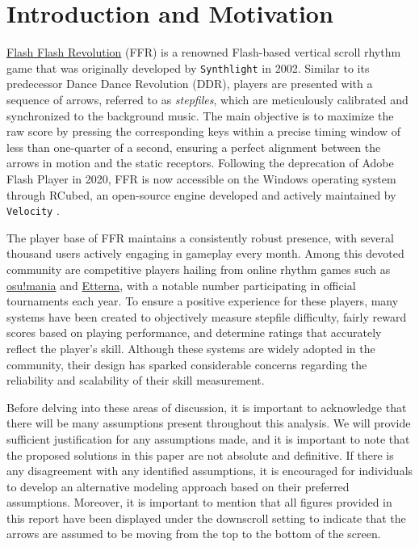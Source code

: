 \section{Introduction and Motivation}
\label{sec:introduction}

\href{https://www.Flash Flash Revolution.com/}{Flash Flash Revolution} (FFR) is a renowned Flash-based vertical scroll rhythm game that was originally developed by \texttt{Synthlight} in 2002. Similar to its predecessor Dance Dance Revolution (DDR), players are presented with a sequence of arrows, referred to as \textit{stepfiles}, which are meticulously calibrated and synchronized to the background music. The main objective is to maximize the raw score by pressing the corresponding keys within a precise timing window of less than one-quarter of a second, ensuring a perfect alignment between the arrows in motion and the static receptors. Following the deprecation of Adobe Flash Player in 2020, FFR is now accessible on the Windows operating system through RCubed, an open-source engine developed and actively maintained by \texttt{Velocity} \cite{20200427}.

\vspace{2mm}

The player base of FFR maintains a consistently robust presence, with several thousand users actively engaging in gameplay every month. Among this devoted community are competitive players hailing from online rhythm games such as \href{https://osu.ppy.sh/}{osu!mania} and \href{https://etternaonline.com/}{Etterna}, with a notable number participating in official tournaments each year. To ensure a positive experience for these players, many systems have been created to objectively measure stepfile difficulty, fairly reward scores based on playing performance, and determine ratings that accurately reflect the player's skill. Although these systems are widely adopted in the community, their design has sparked considerable concerns regarding the reliability and scalability of their skill measurement.

\vspace{2mm}

Before delving into these areas of discussion, it is important to acknowledge that there will be many assumptions present throughout this analysis. We will provide sufficient justification for any assumptions made, and it is important to note that the proposed solutions in this paper are not absolute and definitive. If there is any disagreement with any identified assumptions, it is encouraged for individuals to develop an alternative modeling approach based on their preferred assumptions. Moreover, it is important to mention that all figures provided in this report have been displayed under the downscroll setting to indicate that the arrows are assumed to be moving from the top to the bottom of the screen.

